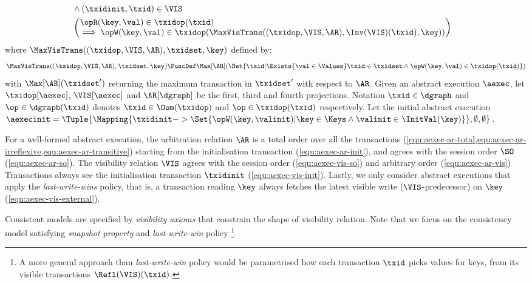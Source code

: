 \begin{definition}
\begin{align}
    \\ & \land (\txidinit, \txid) \in \VIS  \label{equ:aexec-vis-init}
    \\ & \left( \begin{array}{@{}l@{}} \opR(\key,\val) \in \txidop(\txid) 
                    \\ \implies \opW(\key,\val) \in \txidop(\MaxVisTrans((\txidop,\VIS,\AR),\Inv(\VIS)(\txid),\key)) 
         \end{array} \right) \label{equ:aexec-vis-external}
\end{align}
where \( \MaxVisTrans((\txidop,\VIS,\AR),\txidset,\key) \) defined by:
\[
\MaxVisTrans((\txidop,\VIS,\AR),\txidset,\key) \FuncDef 
            \Max[\AR](\Set{ \txid | \Exists{\val \in \Values } 
                \txid \in \txidset \land \opW(\key,\val) \in \txidop(\txid) }) 
\]
with \( \Max[\AR](\txidset') \) returning the maximum transaction in \( \txidset' \)
with respect to \( \AR \).
Given an abstract execution \( \aexec \),
let \( \txidop[\aexec]\), \( \VIS[\aexec] \) and \( \AR[\dgraph]\) be the first, third and fourth projections.
Notation \( \txid \in \dgraph \) and \( \op \in \dgraph(\txid) \) denotes
\( \txid \in \Dom(\txidop) \) and \( \op \in \txidop(\txid) \) respectively.
Let the initial abstract execution 
\( \aexecinit = \Tuple{\Mapping{\txidinit -> \Set{\opW(\key,\valinit) 
                    | \key \in \Keys \land \valinit \in \InitVal(\key) }},\emptyset, \emptyset} \).
\end{definition}

For a well-formed abstract execution, 
the arbitration relation \(\AR\) is a total order over all the transactions 
(\cref{equ:aexec-ar-total,equ:aexec-ar-irreflexive,equ:aexec-ar-transitive})
starting from the initialisation transaction (\cref{equ:aexec-ar-init}),
and agrees with the session order \( \SO \) (\cref{equ:aexec-ar-so}).
The visibility relation \( \VIS \) agrees with the session order (\cref{equ:aexec-vis-so}) 
and arbitrary order (\cref{equ:aexec-ar-vis}) 
Transactions always see the initialisation transaction \( \txidinit \) (\cref{equ:aexec-vis-init}).
Lastly, we only consider abstract executions that apply the \emph{last-write-wins} policy,
that is, a transaction reading \(\key\) always fetches 
the latest visible write (\(\VIS\)-predecessor) on \(\key\) (\cref{equ:aexec-vis-external}).

Consistent models are specified by \emph{visibility axioms}
that constrain the shape of visibility relation.
Note that we focus on the consistency model satisfying 
\emph{snapshot property} and \emph{last-write-win} policy%
\footnote{A more general approach than \emph{last-write-win} policy 
would be parametrised how each transaction \( \txid \) picks values for keys,
from its visible transactions \( \Refl(\VIS)(\txid)\).}.

